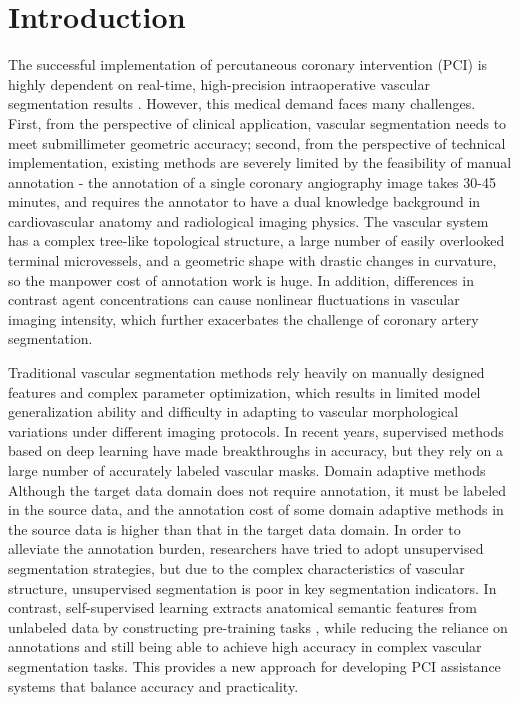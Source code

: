 \section{Introduction}
\label{sec:intro}

The successful implementation of percutaneous coronary intervention (PCI) is highly dependent on real-time, high-precision intraoperative vascular segmentation results \cite{YTL}. However, this medical demand faces many challenges. First, from the perspective of clinical application, vascular segmentation needs to meet submillimeter geometric accuracy; second, from the perspective of technical implementation, existing methods are severely limited by the feasibility of manual annotation - the annotation of a single coronary angiography image takes 30-45 minutes, and requires the annotator to have a dual knowledge background in cardiovascular anatomy and radiological imaging physics. The vascular system has a complex tree-like topological structure, a large number of easily overlooked terminal microvessels, and a geometric shape with drastic changes in curvature, so the manpower cost of annotation work is huge. In addition, differences in contrast agent concentrations can cause nonlinear fluctuations in vascular imaging intensity, which further exacerbates the challenge of coronary artery segmentation.


Traditional vascular segmentation methods \cite{FC.31.YNet}\cite{FC.22.Hessian} rely heavily on manually designed features and complex parameter optimization, which results in limited model generalization ability and difficulty in adapting to vascular morphological variations under different imaging protocols. In recent years, supervised methods based on deep learning \cite{SSVS.8}\cite{SSVS.33}\cite{SSVS.36} have made breakthroughs in accuracy, but they rely on a large number of accurately labeled vascular masks. Domain adaptive methods \cite{SSVS.3}\cite{SSVS.31}\cite{01.00.C-DARL} Although the target data domain does not require annotation, it must be labeled in the source data, and the annotation cost of some domain adaptive methods \cite{00.01.XA-Sim2Real} in the source data is higher than that in the target data domain. In order to alleviate the annotation burden, researchers have tried to adopt unsupervised segmentation \cite{FC.19.IIC}\cite{FC.9.ReDO} strategies, but due to the complex characteristics of vascular structure, unsupervised segmentation is poor in key segmentation indicators. In contrast, 
self-supervised learning extracts anatomical semantic features from unlabeled data by constructing pre-training tasks \cite{01.02.SSVS}\cite{01.01.DARL}\cite{02.01.FreeCOS}, 
while reducing the reliance on annotations and still being able to achieve high accuracy in complex vascular segmentation tasks. 
This provides a new approach for developing PCI assistance systems that balance accuracy and practicality.

